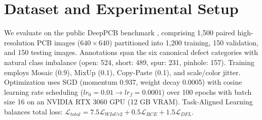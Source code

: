 \documentclass{llncs}
\begin{document}
\begin{table}[!htbp]
\centering
\caption{Quantitative Performance Comparison of Bounding-Box Regression Losses on DeepPCB (Evaluated on YOLOv8s + CBAM Architecture). Bold denotes best result.}
\label{tab:loss_comparison}
\end{table}

\section{Dataset and Experimental Setup}
We evaluate on the public DeepPCB benchmark \cite{ding2021tinypcb}, comprising 1,500 paired high-resolution PCB images ($640\times 640$) partitioned into 1,200 training, 150 validation, and 150 testing images. Annotations span the six canonical defect categories with natural class imbalance (open: 524, short: 489, spur: 231, pinhole: 157). Training employs Mosaic (0.9), MixUp (0.1), Copy-Paste (0.1), and scale/color jitter. Optimization uses SGD (momentum 0.937, weight decay 0.0005) with cosine learning rate scheduling ($lr_0 = 0.01 \to lr_f = 0.0001$) over 100 epochs with batch size 16 on an NVIDIA RTX 3060 GPU (12 GB VRAM). Task-Aligned Learning balances total loss: $\mathcal{L}_{total} = 7.5 \mathcal{L}_{WIoUv2} + 0.5 \mathcal{L}_{BCE} + 1.5 \mathcal{L}_{DFL}$.
\end{document}
